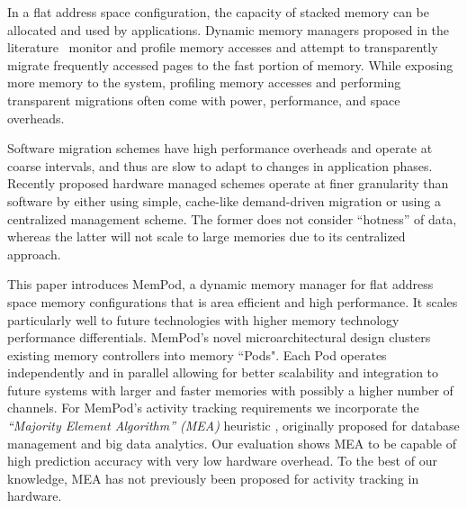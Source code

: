 In a flat address space configuration, the capacity of stacked memory can be allocated and used by applications. Dynamic memory 
managers proposed in the literature~\cite{sim-micro2014,meswani-HPCA21,cameo} 
monitor and profile memory accesses and attempt to transparently migrate 
frequently accessed pages to the fast portion of memory. While exposing
more memory to the system, profiling memory accesses and performing 
transparent migrations often come with power, performance, and space overheads. 



Software migration schemes \cite{meswani-HPCA21} have high performance 
overheads and operate at coarse intervals, and thus are slow to adapt to 
changes in application phases. Recently proposed hardware managed schemes \cite{sim-micro2014,cameo} operate at finer granularity than software by either using simple, cache-like demand-driven migration or using a centralized management scheme. The former does not consider ``hotness'' of data, whereas the latter will not scale to large memories due to its centralized approach.

This paper introduces MemPod, a dynamic memory manager for flat address space memory configurations that is area efficient and high performance.
It scales particularly well to future technologies with 
higher memory technology performance differentials. 
MemPod's novel microarchitectural design clusters existing memory controllers into memory ``Pods". Each Pod operates independently and in parallel allowing for better scalability and integration to future systems with larger and faster memories with possibly a higher number of channels. For MemPod's activity tracking requirements we incorporate the \emph{``Majority Element Algorithm'' (MEA)} heuristic \cite{karp-mea,charikar-mea}, originally proposed for database management and big data analytics. Our evaluation shows MEA to be capable of high prediction accuracy with very low hardware overhead. To the best of our knowledge, MEA has 
not previously been proposed for activity tracking in hardware.

